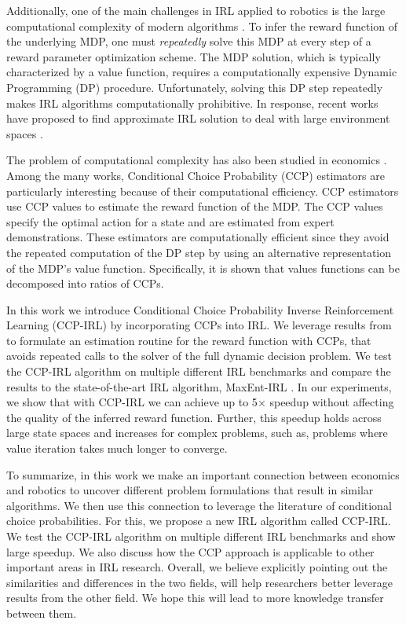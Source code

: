 \documentclass{article}
\begin{document}
Additionally, one of the main challenges in IRL applied to robotics is the large computational complexity of modern algorithms \cite{ziebart, Ratliff2006}. To infer the reward function of the underlying MDP, one must \textit{repeatedly} solve this MDP at every step of a reward parameter optimization scheme. The MDP solution, which is typically characterized by a value function, requires a computationally expensive Dynamic Programming (DP) procedure. Unfortunately, solving this DP step repeatedly makes IRL algorithms computationally prohibitive. In response, recent works have proposed  to find approximate IRL solution to deal with large environment spaces \cite{finn2016guided, levine2012continuous, huang2015approximate}.

The problem of computational complexity has also been studied in economics \cite{hotz, su2012constrained, aguirregabiria2002swapping}. Among the many works, Conditional Choice Probability (CCP) estimators \cite{hotz} are particularly interesting because of their computational efficiency.
CCP estimators use CCP values to estimate the reward function of the MDP.
The CCP values specify the optimal action for a state and are estimated from expert demonstrations. These estimators are computationally efficient since they avoid the repeated computation of the DP step by using an alternative representation of the MDP's value function. Specifically, it is shown that values functions can be decomposed into ratios of CCPs.

In this work we introduce Conditional Choice Probability Inverse Reinforcement Learning (CCP-IRL) by incorporating CCPs into IRL. We leverage results from \cite{rust_gmc, hotz, magnac} to formulate an estimation routine for the reward function with CCPs, that avoids repeated calls to the solver of the full dynamic decision problem. We test the CCP-IRL algorithm on multiple different IRL benchmarks and compare the results to the state-of-the-art IRL algorithm, MaxEnt-IRL \cite{ziebart}. In our experiments, we show that with CCP-IRL we can achieve up to 5$\times$ speedup without affecting the quality of the inferred reward function. Further, this speedup holds across large state spaces and increases for complex problems, such as, problems where value iteration takes much longer to converge. 

To summarize, in this work we make an important connection between economics and robotics to uncover different problem formulations that result in similar algorithms. We then use this connection to leverage the literature of conditional choice probabilities. For this, we propose a new IRL algorithm called CCP-IRL. We test the CCP-IRL algorithm on multiple different IRL benchmarks and show large speedup. We also discuss how the CCP approach is applicable to other important areas in IRL research.
Overall, we believe explicitly pointing out the similarities and differences in the two fields, will help researchers better leverage results from the other field. We hope this will lead to more knowledge transfer between them.
\end{document}
